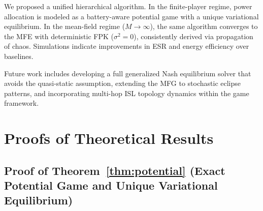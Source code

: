 \documentclass[journal]{IEEEtran}
\begin{document}
We proposed a unified hierarchical algorithm. In the finite-player regime, power allocation is modeled as a battery-aware potential game with a unique variational equilibrium. In the mean-field regime ($M\to\infty$), the same algorithm converges to the MFE with deterministic FPK ($\sigma^2=0$), consistently derived via propagation of chaos. Simulations indicate improvements in ESR and energy efficiency over baselines.

Future work includes developing a full generalized Nash equilibrium solver that avoids the quasi-static assumption, extending the MFG to stochastic eclipse patterns, and incorporating multi-hop ISL topology dynamics within the game framework.




\clearpage

\appendices
\section{Proofs of Theoretical Results}
\label{app:proofs}

\subsection{Proof of Theorem~\ref{thm:potential}
(Exact Potential Game and Unique Variational Equilibrium)}
\end{document}
